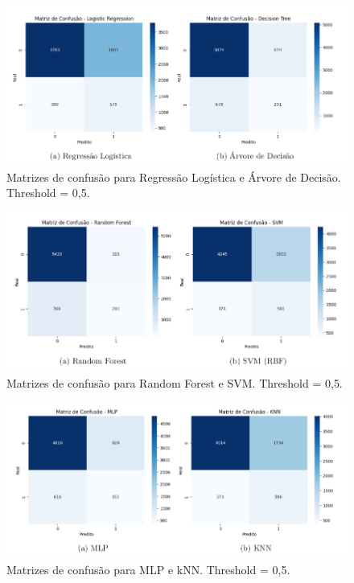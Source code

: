 \documentclass[english, spanish, brazilian]{RBIEarticle} %
\begin{document}
\begin{figure}[H]\centering
    \includegraphics[width=1\textwidth]{images/matrizes-confusao-log-dec.png}
    \caption{Matrizes de confusão para Regressão Logística e Árvore de Decisão. Threshold = 0{,}5.}
    \label{fig:cms-a}
\end{figure}

\begin{figure}[H]\centering
    \includegraphics[width=1\textwidth]{images/matrizes-confusao-for-svm.png}
    \caption{Matrizes de confusão para Random Forest e SVM. Threshold = 0{,}5.}
    \label{fig:cms-b}
\end{figure}

\begin{figure}[H]\centering
    \includegraphics[width=1\textwidth]{images/matrizes-confusao-mlp-knn.png}
    \caption{Matrizes de confusão para MLP e kNN. Threshold = 0{,}5.}
    \label{fig:cms-c}
\end{figure}
\end{document}
